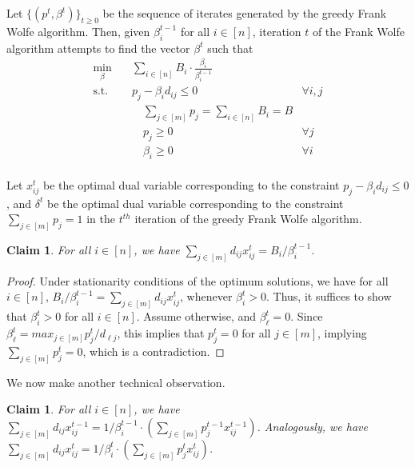 \documentclass[format=acmsmall,authorversion]{acmart}
\newtheorem{claim}[theorem]{Claim}
\begin{document}
Let $\{(p^t, \beta^t)\}_{t \geq 0}$ be the sequence of iterates generated by the greedy Frank Wolfe algorithm. Then, given $\beta^{t-1}_i$ for all $i\in [n]$, iteration $t$ of the Frank Wolfe algorithm attempts to find the vector $\beta^t$ such that 
\begin{equation}
\begin{aligned}
\min_{\beta} \quad & \sum_{i \in [n]} B_i \cdot \frac{\beta_i}{\beta^{t-1}_i}\\
\textrm{s.t.} \quad &  p_j - \beta_id_{ij} \leq 0  &\forall i,j\\
  &\quad  \sum_{j \in [m]} p_j =\sum_{i \in [n]}B_i = B    \\
  &\quad p_j \geq 0 &\forall j \\
  &\quad \beta_i \geq 0 &\forall i \\
\end{aligned}
\end{equation}

Let $x^t_{ij}$ be the optimal dual variable corresponding to the constraint $p_j - \beta_i d_{ij} \leq 0$, and $\delta^t$ be the optimal dual variable corresponding to the constraint $\sum_{j \in [m]}p_j = 1$ in the $t^{\mathit{th}}$ iteration of the greedy Frank Wolfe algorithm. 

\begin{claim}
\label{distutility-tech}
    For all $i \in [n]$, we have $\sum_{j \in [m]}d_{ij}x^t_{ij} = B_i/ \beta^{t-1}_i$. 
\end{claim}
\begin{proof}
    Under stationarity conditions of the optimum solutions, we have for all $i \in [n]$, $B_i/ \beta^{t-1}_i = \sum_{j \in [m]}d_{ij} x^t_{ij}$, whenever $\beta^t_i > 0$. Thus, it suffices to show that $\beta^t_i > 0$ for all $i \in [n]$. Assume otherwise, and $\beta^t_{\ell} = 0$. Since $\beta^t_{\ell} = \mathit{max}_{j \in [m]} p^t_{j}/d_{\ell j}$, this implies that $p^t_j = 0 $ for all $j \in [m]$, implying $\sum_{j \in [m]}p^t_j = 0$, which is a contradiction.
\end{proof}

We now make another technical observation. 

\begin{claim}
\label{disutilities-outflows}
    For all $i \in [n]$, we have  $\sum_{j \in [m]} d_{ij}x^{t-1}_{ij} = 1/\beta^{t-1}_i \cdot (\sum_{j \in [m]} p^{t-1}_j x^{t-1}_{ij}) $. Analogously, we have  $\sum_{j \in [m]} d_{ij}x^t_{ij} = 1/\beta^t_i \cdot (\sum_{j \in [m]} p^t_j x^t_{ij}) $.
\end{claim}
\end{document}

